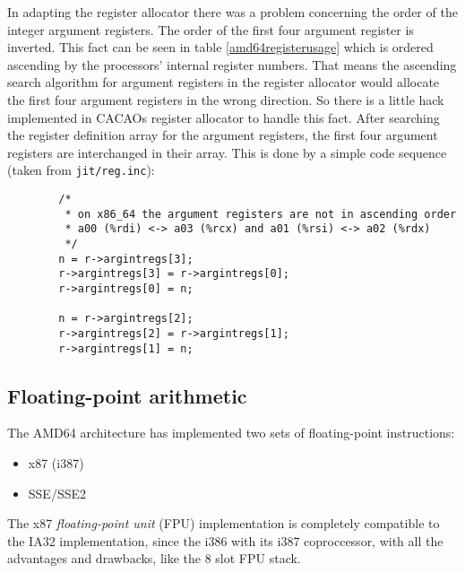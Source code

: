In adapting the register allocator there was a problem concerning the
order of the integer argument registers. The order of the first four
argument register is inverted. This fact can be seen in table
\ref{amd64registerusage} which is ordered ascending by the processors'
internal register numbers. That means the ascending search algorithm
for argument registers in the register allocator would allocate the
first four argument registers in the wrong direction. So there is a
little hack implemented in CACAOs register allocator to handle this
fact. After searching the register definition array for the argument
registers, the first four argument registers are interchanged in their
array. This is done by a simple code sequence (taken from
\texttt{jit/reg.inc}):

\begin{verbatim}
        /* 
         * on x86_64 the argument registers are not in ascending order 
         * a00 (%rdi) <-> a03 (%rcx) and a01 (%rsi) <-> a02 (%rdx)
         */
        n = r->argintregs[3];
        r->argintregs[3] = r->argintregs[0];
        r->argintregs[0] = n;

        n = r->argintregs[2];
        r->argintregs[2] = r->argintregs[1];
        r->argintregs[1] = n;
\end{verbatim}


\subsection{Floating-point arithmetic}

The AMD64 architecture has implemented two sets of floating-point
instructions:

\begin{itemize}
\item x87 (i387)
\item SSE/SSE2
\end{itemize}

The x87 \textit{floating-point unit} (FPU) implementation is
completely compatible to the IA32 implementation, since the i386 with
its i387 coproccessor, with all the advantages and drawbacks, like the
8 slot FPU stack.

